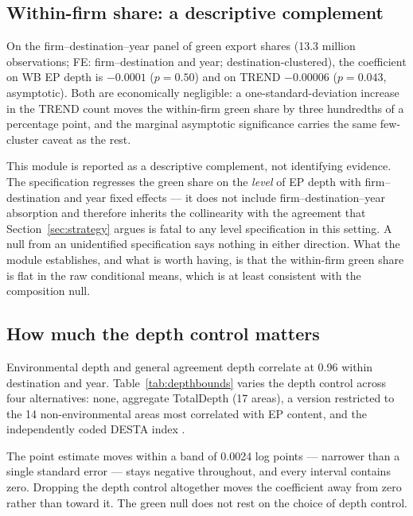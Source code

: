 \documentclass[12pt]{article}
\begin{document}
\subsection{Within-firm share: a descriptive complement}

On the firm--destination--year panel of green export shares (13.3 million observations;
FE: firm--destination and year; destination-clustered), the coefficient on WB EP depth
is $-0.0001$ ($p = 0.50$) and on TREND $-0.00006$ ($p = 0.043$, asymptotic). Both are
economically negligible: a one-standard-deviation increase in the TREND count moves the
within-firm green share by three hundredths of a percentage point, and the marginal
asymptotic significance carries the same few-cluster caveat as the rest.

This module is reported as a descriptive complement, not identifying evidence. The
specification regresses the green share on the \emph{level} of EP depth with
firm--destination and year fixed effects --- it does not include firm--destination--year
absorption and therefore inherits the collinearity with the agreement that
Section~\ref{sec:strategy} argues is fatal to any level specification in this setting. A
null from an unidentified specification says nothing in either direction. What the module
establishes, and what is worth having, is that the within-firm green share is flat in the
raw conditional means, which is at least consistent with the composition null.

\subsection{How much the depth control matters}

Environmental depth and general agreement depth correlate at 0.96 within destination and
year. Table~\ref{tab:depthbounds} varies the depth control across four alternatives: none,
aggregate TotalDepth (17 areas), a version restricted to the 14 non-environmental areas
most correlated with EP content, and the independently coded DESTA index \citep{dur2014}.

\begin{table}[htbp]
\centering
\caption{EP$\times$green under alternative depth controls (collapsed panel, WB index)}
\label{tab:depthbounds}

\end{table}

The point estimate moves within a band of 0.0024 log points --- narrower than a single
standard error --- stays negative throughout, and every interval contains zero. Dropping
the depth control altogether moves the coefficient away from zero rather than toward it.
The green null does not rest on the choice of depth control.
\end{document}
